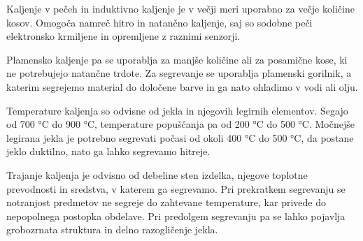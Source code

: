 Kaljenje v pečeh in induktivno kaljenje je v večji meri uporabno
za večje količine kosov. Omogoča namreč hitro in natančno kaljenje,
saj so sodobne peči elektronsko krmiljene in opremljene z raznimi senzorji.

Plamensko kaljenje pa se uporablja za manjše količine ali za
posamične kose, ki ne potrebujejo natančne trdote. Za
segrevanje se uporablja plamenski gorilnik, a katerim segrejemo
material do določene barve in ga nato ohladimo v vodi ali olju.

Temperature kaljenja so odvisne od jekla in njegovih legirnih
elementov. Segajo od 700 °C do 900 °C, temperature popuščanja
pa od 200 °C do 500 °C. Močnejše legirana jekla je potrebno
segrevati počasi od okoli 400 °C do 500 °C, da postane jeklo
duktilno, nato ga lahko segrevamo hitreje.

Trajanje kaljenja je odvisno od debeline sten izdelka, njegove toplotne
prevodnosti in sredstva, v katerem ga segrevamo. Pri prekratkem
segrevanju se notranjost predmetov ne segreje do zahtevane
temperature, kar privede do nepopolnega postopka obdelave. Pri
predolgem segrevanju pa se lahko pojavlja grobozrnata struktura
in delno razogličenje jekla.